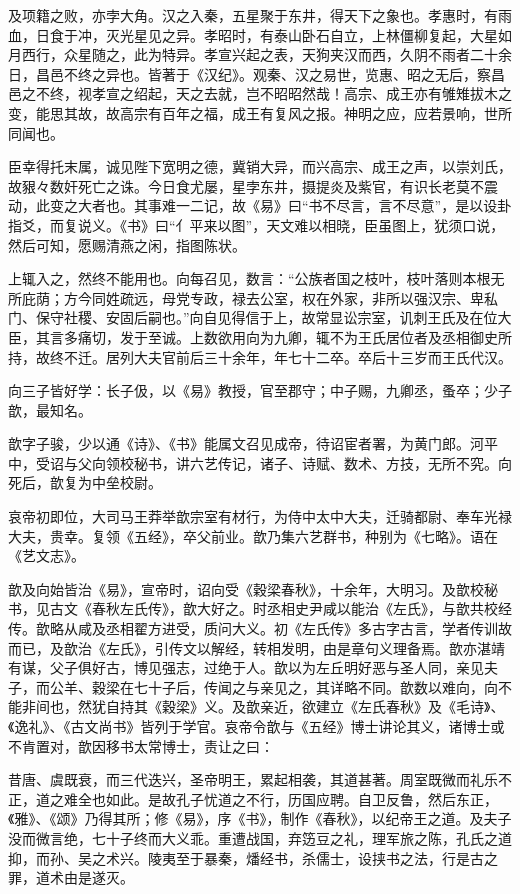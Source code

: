 \documentclass[]{article}
\begin{document}
及项籍之败，亦孛大角。汉之入秦，五星聚于东井，得天下之象也。孝惠时，有雨血，日食于冲，灭光星见之异。孝昭时，有泰山卧石自立，上林僵柳复起，大星如月西行，众星随之，此为特异。孝宣兴起之表，天狗夹汉而西，久阴不雨者二十余日，昌邑不终之异也。皆著于《汉纪》。观秦、汉之易世，览惠、昭之无后，察昌邑之不终，视孝宣之绍起，天之去就，岂不昭昭然哉！高宗、成王亦有雊雉拔木之变，能思其故，故高宗有百年之福，成王有复风之报。神明之应，应若景响，世所同闻也。

臣幸得托末属，诚见陛下宽明之德，冀销大异，而兴高宗、成王之声，以崇刘氏，故豤々数奸死亡之诛。今日食尤屡，星孛东井，摄提炎及紫官，有识长老莫不震动，此变之大者也。其事难一二记，故《易》曰``书不尽言，言不尽意''，是以设卦指爻，而复说义。《书》曰``亻平来以图''，天文难以相晓，臣虽图上，犹须口说，然后可知，愿赐清燕之闲，指图陈状。

上辄入之，然终不能用也。向每召见，数言：``公族者国之枝叶，枝叶落则本根无所庇荫；方今同姓疏远，母党专政，禄去公室，权在外家，非所以强汉宗、卑私门、保守社稷、安固后嗣也。''向自见得信于上，故常显讼宗室，讥刺王氏及在位大臣，其言多痛切，发于至诚。上数欲用向为九卿，辄不为王氏居位者及丞相御史所持，故终不迁。居列大夫官前后三十余年，年七十二卒。卒后十三岁而王氏代汉。

向三子皆好学：长子伋，以《易》教授，官至郡守；中子赐，九卿丞，蚤卒；少子歆，最知名。

歆字子骏，少以通《诗》、《书》能属文召见成帝，待诏宦者署，为黄门郎。河平中，受诏与父向领校秘书，讲六艺传记，诸子、诗赋、数术、方技，无所不究。向死后，歆复为中垒校尉。

哀帝初即位，大司马王莽举歆宗室有材行，为侍中太中大夫，迁骑都尉、奉车光禄大夫，贵幸。复领《五经》，卒父前业。歆乃集六艺群书，种别为《七略》。语在《艺文志》。

歆及向始皆治《易》，宣帝时，诏向受《穀梁春秋》，十余年，大明习。及歆校秘书，见古文《春秋左氏传》，歆大好之。时丞相史尹咸以能治《左氏》，与歆共校经传。歆略从咸及丞相翟方进受，质问大义。初《左氏传》多古字古言，学者传训故而已，及歆治《左氏》，引传文以解经，转相发明，由是章句义理备焉。歆亦湛靖有谋，父子俱好古，博见强志，过绝于人。歆以为左丘明好恶与圣人同，亲见夫子，而公羊、穀梁在七十子后，传闻之与亲见之，其详略不同。歆数以难向，向不能非间也，然犹自持其《穀梁》义。及歆亲近，欲建立《左氏春秋》及《毛诗》、《逸礼》、《古文尚书》皆列于学官。哀帝令歆与《五经》博士讲论其义，诸博士或不肯置对，歆因移书太常博士，责让之曰：

昔唐、虞既衰，而三代迭兴，圣帝明王，累起相袭，其道甚著。周室既微而礼乐不正，道之难全也如此。是故孔子忧道之不行，历国应聘。自卫反鲁，然后东正，《雅》、《颂》乃得其所；修《易》，序《书》，制作《春秋》，以纪帝王之道。及夫子没而微言绝，七十子终而大义乖。重遭战国，弃笾豆之礼，理军旅之陈，孔氏之道抑，而孙、吴之术兴。陵夷至于暴秦，燔经书，杀儒士，设挟书之法，行是古之罪，道术由是遂灭。
\end{document}
